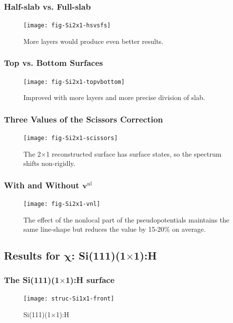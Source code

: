 \documentclass{beamer}
\begin{document}
\begin{frame}
\frametitle{Half-slab vs. Full-slab}
\begin{figure}
\centering
\texttt{[image: fig-Si2x1-hsvsfs]}
\caption{More layers would produce even better results.}
\end{figure}
\end{frame}

\begin{frame}
\frametitle{Top vs. Bottom Surfaces}
\begin{figure}
\centering
\texttt{[image: fig-Si2x1-topvbottom]}
\caption{Improved with more layers and more precise division of slab.}
\end{figure}
\end{frame}

\begin{frame}
\frametitle{Three Values of the Scissors Correction}
\begin{figure}
\centering
\texttt{[image: fig-Si2x1-scissors]}
\caption{The 2$\times$1 reconstructed surface has surface states, so the
spectrum shifts non-rigidly.}
\end{figure}
\end{frame}

\begin{frame}
\frametitle{With and Without \texorpdfstring{$\mathbf{v}^{\mathrm{nl}}$}{vnl}}
\begin{figure}
\centering
\texttt{[image: fig-Si2x1-vnl]}
\caption{The effect of the nonlocal part of the pseudopotentials maintains the
same line-shape but reduces the value by 15-20\% on average.}
\end{figure}
\end{frame}



\subsection{Results for \texorpdfstring{$\boldsymbol{\chi}$}{X}:
\texorpdfstring{Si(111)(1$\times$1):H}{Si(111)(1x1):H}}

\begin{frame}
\frametitle{The Si(111)(1$\times$1):H surface}
\begin{figure}
\centering
\texttt{[image: struc-Si1x1-front]}
\caption{Si(111)(1$\times$1):H}
\end{figure}
\end{frame}
\end{document}
